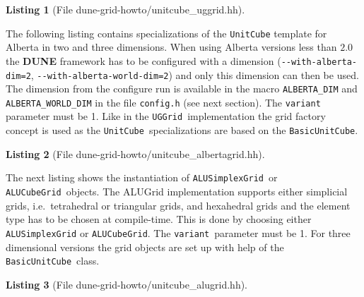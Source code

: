 \documentclass[11pt,a4paper,headinclude,footinclude,DIV16,normalheadings]{scrreprt}
\newcommand{\Dune}{{\sf\bfseries DUNE}\xspace}
\newtheorem{lst}{Listing}
\begin{document}
\begin{lst}[File dune-grid-howto/unitcube\_uggrid.hh] \mbox{}
\nopagebreak

\end{lst}


The following listing contains specializations of the
\lstinline!UnitCube! template for Alberta in two and three
dimensions. When using Alberta versions less than $2.0$ the \Dune{} framework
has to be configured with a dimension (\lstinline!--with-alberta-dim=2!,
\lstinline!--with-alberta-world-dim=2!) and only this dimension can then be
used. 
The dimension from the configure run is available in the macro
\lstinline!ALBERTA_DIM! and \lstinline!ALBERTA_WORLD_DIM! 
in the file \lstinline!config.h! (see
next section). The \lstinline!variant! parameter must be 1. Like in the
\lstinline!UGGrid!\ implementation the grid factory concept is used as the
\lstinline!UnitCube!\ specializations are based on the
\lstinline!BasicUnitCube!.

\begin{lst}[File dune-grid-howto/unitcube\_albertagrid.hh] \mbox{}
\nopagebreak

\end{lst}


The next listing shows the instantiation of \lstinline!ALUSimplexGrid!\ or 
\lstinline!ALUCubeGrid!\ objects. 
The ALUGrid implementation supports either simplicial grids, i.e.\ 
tetrahedral or triangular grids, and hexahedral grids and the
element type has to be chosen at compile-time. This is done by choosing 
either \lstinline!ALUSimplexGrid! or \lstinline!ALUCubeGrid!. 
The \lstinline!variant!\ parameter must be 1. 
For three dimensional versions the grid objects are set up with help of the
\lstinline!BasicUnitCube!\ class.

\begin{lst}[File dune-grid-howto/unitcube\_alugrid.hh] \mbox{}
\nopagebreak

\end{lst}



\end{document}

